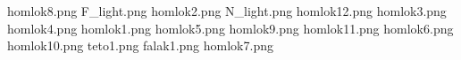homlok8.png
F_light.png
homlok2.png
N_light.png
homlok12.png
homlok3.png
homlok4.png
homlok1.png
homlok5.png
homlok9.png
homlok11.png
homlok6.png
homlok10.png
teto1.png
falak1.png
homlok7.png
